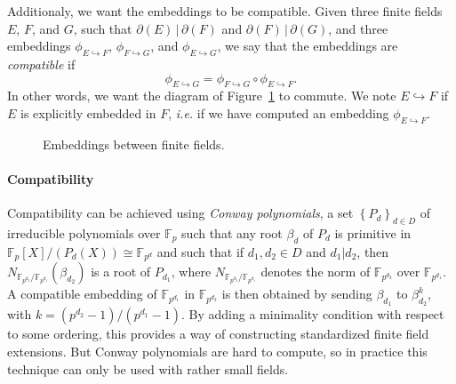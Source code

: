 \documentclass[12pt]{article}
\newcommand{\dE}{\partial(E)}
\newcommand{\dF}{\partial(F)}
\newcommand{\dG}{\partial(G)}
\newcommand{\emb}{\hookrightarrow}
\newcommand{\embed}[2]{\phi_{#1\hookrightarrow#2}}
\newcommand{\ie}{\emph{i.e. }}
\begin{document}
Additionaly, we want the embeddings to be compatible. Given three finite 
fields $E$, $F$, and $G$, such that $\dE\,|\,\dF$ and $\dF\,|\,\dG$, and three 
embeddings $\embed{E}{F}$, $\embed{F}{G}$, and $\embed{E}{G}$, we say that the
embeddings are \emph{compatible} if 
\[
  \embed{E}{G}=\embed{F}{G}\circ\embed{E}{F}.
\]
In other words, we want the diagram of Figure~\ref{fig:compatibility} to
commute. We note $E\emb F$ if $E$ is explicitly embedded in $F$, \ie if
we have computed an embedding $\embed{E}{F}$.
\begin{figure}
  \centering

  \caption{Embeddings between finite fields.}
  \label{fig:compatibility}
\end{figure}

\paragraph{Compatibility}

Compatibility can be achieved using \emph{Conway polynomials}, a set $\left\{
P_d \right\}_{d\in D}$ of
irreducible polynomials over $\mathbb{F}_p$ such that any root $\beta_d$ of
$P_d$ is primitive in $\mathbb{F}_{p}[X]/(P_d(X))\cong \mathbb{F}_{p^d}$ and
such that if $d_1, d_2\in D$ and $d_1|d_2$, then
$N_{\mathbb{F}_{p^{d_2}}/\mathbb{F}_{p^{d_1}}}(\beta_{d_2})$ is a root of
$P_{d_1}$, where $N_{\mathbb{F}_{p^{d_2}}/\mathbb{F}_{p^{d_1}}}$ denotes
the norm of $\mathbb{F}_{p^{d_2}}$ over $\mathbb{F}_{p^{d_1}}$. A compatible
embedding of $\mathbb{F}_{p^{d_1}}$ in $\mathbb{F}_{p^{d_2}}$ is then obtained
by sending $\beta_{d_1}$ to $\beta_{d_2}^k$, with $k=(p^{d_2}-1)/(p^{d_1}-1)$.
By adding a minimality condition with respect to some ordering, this provides a
way of constructing standardized finite field extensions. But Conway polynomials
are hard to compute, so in practice this technique can only be used with rather
small fields.
\end{document}
